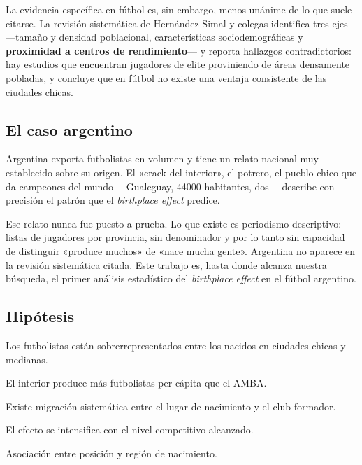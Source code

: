 \documentclass[11pt,a4paper]{article}
\begin{document}
La evidencia específica en fútbol es, sin embargo, menos unánime de lo que suele
citarse. La revisión sistemática de Hernández-Simal y colegas \cite{revision2024}
identifica tres ejes —tamaño y densidad poblacional, características
sociodemográficas y \textbf{proximidad a centros de rendimiento}— y reporta
hallazgos contradictorios: hay estudios que encuentran jugadores de elite
proviniendo de áreas densamente pobladas, y concluye que en fútbol no existe una
ventaja consistente de las ciudades chicas.

\subsection{El caso argentino}

Argentina exporta futbolistas en volumen y tiene un relato nacional muy
establecido sobre su origen. El «crack del interior», el potrero, el pueblo chico
que da campeones del mundo —Gualeguay, \num{44000} habitantes, dos— describe con
precisión el patrón que el \emph{birthplace effect} predice.

Ese relato nunca fue puesto a prueba. Lo que existe es periodismo descriptivo:
listas de jugadores por provincia, sin denominador y por lo tanto sin capacidad
de distinguir «produce muchos» de «nace mucha gente». Argentina no aparece en la
revisión sistemática citada. Este trabajo es, hasta donde alcanza nuestra
búsqueda, el primer análisis estadístico del \emph{birthplace effect} en el
fútbol argentino.

\subsection{Hipótesis}

\begin{description}[leftmargin=2.2em,style=nextline,itemsep=0.15em]
  \item[H1] Los futbolistas están sobrerrepresentados entre los nacidos en
    ciudades chicas y medianas.
  \item[H2] El interior produce más futbolistas per cápita que el AMBA.
  \item[H3] Existe migración sistemática entre el lugar de nacimiento y el club
    formador.
  \item[H4] El efecto se intensifica con el nivel competitivo alcanzado.
  \item[Exploratorio] Asociación entre posición y región de nacimiento.
\end{description}
\end{document}
